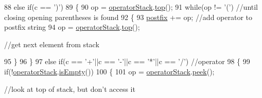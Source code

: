 \begin{DoxyCode}
{            }
88          \textcolor{keywordflow}{else} \textcolor{keywordflow}{if}(c == \textcolor{charliteral}{')'})
89          \{
90             op = \hyperlink{classAlgebraicExpression_a863ef1cc73b9b3b49c199f1564cbcc2e}{operatorStack}.\hyperlink{classStack_ad461f6de40c8672dbf743068f4515061}{top}();
91             \textcolor{keywordflow}{while}(op != \textcolor{charliteral}{'('}) \textcolor{comment}{//until closing opening parentheses is found                                  
                                                                                                       }
92             \{
93                \hyperlink{classAlgebraicExpression_a0c9827f84bf13c0f0f4a096e72462a44}{postfix} += op; \textcolor{comment}{//add operator to postfix string                                      
                                                                                                              }
94                op = \hyperlink{classAlgebraicExpression_a863ef1cc73b9b3b49c199f1564cbcc2e}{operatorStack}.\hyperlink{classStack_ad461f6de40c8672dbf743068f4515061}{top}(); \textcolor{comment}{//get next element from stack                     
                                                                                                                  
           }
95             \}
96          \}
97          \textcolor{keywordflow}{else} \textcolor{keywordflow}{if}(c == \textcolor{charliteral}{'+'}||c == \textcolor{charliteral}{'-'}||c == \textcolor{charliteral}{'*'}||c == \textcolor{charliteral}{'/'}) \textcolor{comment}{//operator                                        
                                                                                                       }
98          \{
99             \textcolor{keywordflow}{if}(!\hyperlink{classAlgebraicExpression_a863ef1cc73b9b3b49c199f1564cbcc2e}{operatorStack}.\hyperlink{classStack_ad0db0d9b249e871bb7504ed89a99d3a7}{isEmpty}())
100             \{
101                op = \hyperlink{classAlgebraicExpression_a863ef1cc73b9b3b49c199f1564cbcc2e}{operatorStack}.\hyperlink{classStack_adcb4774ac8aa94cbc19b461da9bdee3a}{peek}(); \textcolor{comment}{//look at top of stack, but don't access it     
                                                                                                                  
}
\end{DoxyCode}
